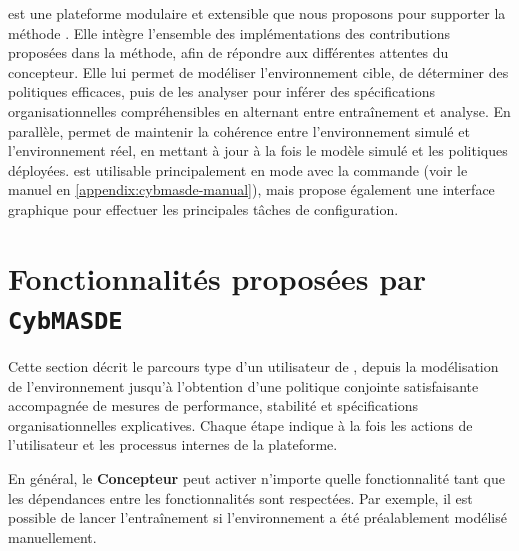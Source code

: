\footnotemark[1] est une plateforme modulaire et extensible que nous proposons pour supporter la méthode . Elle intègre l'ensemble des implémentations des contributions proposées dans la méthode, afin de répondre aux différentes attentes du concepteur.
Elle lui permet de modéliser l'environnement cible, de déterminer des politiques efficaces, puis de les analyser pour inférer des spécifications organisationnelles compréhensibles en alternant entre entraînement et analyse. En parallèle,  permet de maintenir la cohérence entre l'environnement simulé et l'environnement réel, en mettant à jour à la fois le modèle simulé et les politiques déployées.
%
 est utilisable principalement en mode  avec la commande  (voir le manuel en \autoref{appendix:cybmasde-manual}), mais propose également une interface graphique pour effectuer les principales tâches de configuration.


\section{Fonctionnalités proposées par \texttt{CybMASDE}}

Cette section décrit le parcours type d'un utilisateur de , depuis la modélisation de l'environnement jusqu'à l'obtention d'une politique conjointe satisfaisante accompagnée de mesures de performance, stabilité et spécifications organisationnelles explicatives. Chaque étape indique à la fois les actions de l'utilisateur et les processus internes de la plateforme.

En général, le \textbf{Concepteur} peut activer n'importe quelle fonctionnalité tant que les dépendances entre les fonctionnalités sont respectées.
Par exemple, il est possible de lancer l'entraînement si l'environnement a été préalablement modélisé manuellement.



